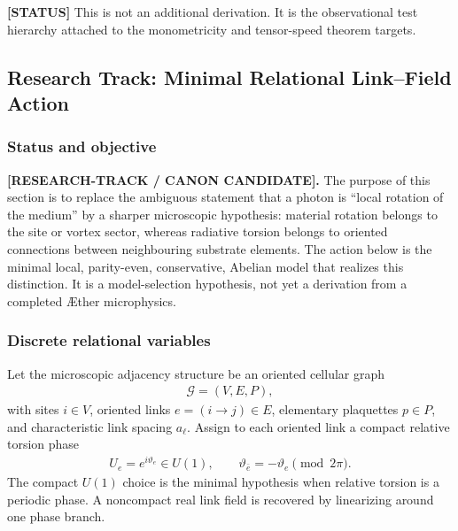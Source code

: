 \textbf{[STATUS]} This is not an additional derivation. It is the observational
test hierarchy attached to the monometricity and tensor-speed theorem targets.


\subsection{Research Track: Minimal Relational Link--Field Action}
\label{sec:rt_minimal_link_field_action}

\subsubsection{Status and objective}

\textbf{[RESEARCH-TRACK / CANON CANDIDATE].}
The purpose of this section is to replace the ambiguous statement that a photon
is ``local rotation of the medium'' by a sharper microscopic hypothesis:
material rotation belongs to the site or vortex sector, whereas radiative
torsion belongs to oriented connections between neighbouring substrate elements.
The action below is the minimal local, parity-even, conservative, Abelian model
that realizes this distinction.  It is a model-selection hypothesis, not yet a
derivation from a completed \AE ther microphysics.

\subsubsection{Discrete relational variables}

Let the microscopic adjacency structure be an oriented cellular graph
\begin{align}
    \mathcal G=(V,E,P),
\end{align}
with sites $i\in V$, oriented links $e=(i\!\to\!j)\in E$, elementary
plaquettes $p\in P$, and characteristic link spacing $a_\ell$.  Assign to each
oriented link a compact relative torsion phase
\begin{align}
    U_e=e^{i\vartheta_e}\in U(1),
    \qquad
    \vartheta_{\bar e}=-\vartheta_e\pmod{2\pi}.
    \label{eq:rt_link_compact_phase}
\end{align}
The compact $U(1)$ choice is the minimal hypothesis when relative torsion is a
periodic phase.  A noncompact real link field is recovered by linearizing around
one phase branch.

